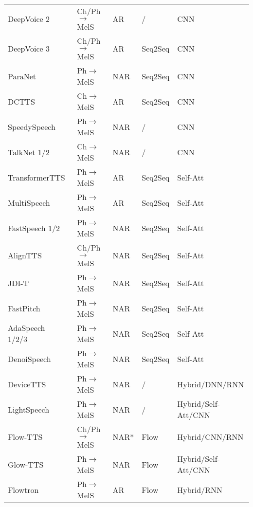 \documentclass{article}
\begin{document}
\begin{table}[h!]
\begin{tabular}{l | l l l l }
        DeepVoice 2~\cite{gibiansky2017deep} & Ch/Ph$\rightarrow$MelS & AR & / & CNN \\
        DeepVoice 3~\cite{ping2018deep} & Ch/Ph$\rightarrow$MelS & AR & Seq2Seq & CNN \\
        ParaNet~\cite{peng2020non}  & Ph$\rightarrow$MelS & NAR & Seq2Seq & CNN \\
        DCTTS~\cite{tachibana2018efficiently} & Ch$\rightarrow$MelS & AR & Seq2Seq & CNN \\
        SpeedySpeech~\cite{vainer2020speedyspeech} & Ph$\rightarrow$MelS & NAR & / & CNN  \\
        TalkNet 1/2~\cite{beliaev2020talknet,beliaev2021talknet} & Ch$\rightarrow$MelS & NAR & / & CNN  \\
        \midrule
        TransformerTTS~\cite{li2019neural} & Ph$\rightarrow$MelS & AR & Seq2Seq & Self-Att \\
        MultiSpeech~\cite{chen2020multispeech} & Ph$\rightarrow$MelS & AR & Seq2Seq & Self-Att  \\
        FastSpeech 1/2~\cite{ren2019fastspeech,ren2021fastspeech} & Ph$\rightarrow$MelS & NAR & Seq2Seq & Self-Att \\
        AlignTTS~\cite{zeng2020aligntts}  & Ch/Ph$\rightarrow$MelS & NAR & Seq2Seq & Self-Att \\
        JDI-T~\cite{lim2020jdi}  & Ph$\rightarrow$MelS & NAR & Seq2Seq & Self-Att  \\
        FastPitch~\cite{lancucki2020fastpitch} & Ph$\rightarrow$MelS & NAR & Seq2Seq & Self-Att  \\
        AdaSpeech 1/2/3~\cite{chen2021adaspeech,yan2021adaspeech,yan2021adaspeech3} & Ph$\rightarrow$MelS & NAR & Seq2Seq & Self-Att  \\
        DenoiSpeech~\cite{zhang2020denoising} & Ph$\rightarrow$MelS & NAR & Seq2Seq & Self-Att  \\
        DeviceTTS~\cite{huang2020devicetts} & Ph$\rightarrow$MelS & NAR & / &  Hybrid/DNN/RNN   \\
        LightSpeech~\cite{luo2021lightspeech}  & Ph$\rightarrow$MelS & NAR & / & Hybrid/Self-Att/CNN  \\
        \midrule
        Flow-TTS~\cite{miao2020flow}  & Ch/Ph$\rightarrow$MelS & NAR* & Flow & Hybrid/CNN/RNN \\
        Glow-TTS~\cite{kim2020glow} & Ph$\rightarrow$MelS & NAR & Flow & Hybrid/Self-Att/CNN \\
        Flowtron~\cite{valle2020flowtron} & Ph$\rightarrow$MelS & AR & Flow & Hybrid/RNN \\

\end{tabular}
\end{table}
\end{document}
